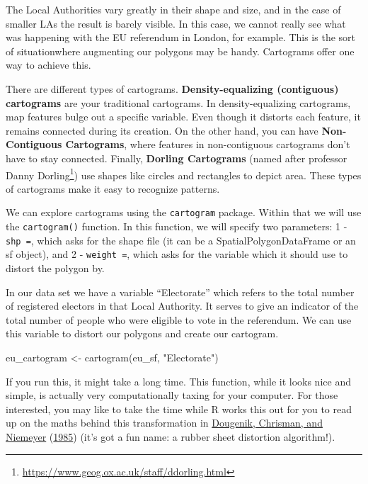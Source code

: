 \documentclass[
  krantz2]{krantz}
\makeatletter
\newenvironment{Shaded}{\begin{snugshade}}{\end{snugshade}}
\newcommand{\FunctionTok}[1]{\textcolor[rgb]{0,0,0}{#1}}
\newcommand{\NormalTok}[1]{#1}
\newcommand{\OtherTok}[1]{\textcolor[rgb]{0.37,0.37,0.37}{#1}}
\newcommand{\StringTok}[1]{\textcolor[rgb]{0.5,0.5,0.5}{#1}}
\renewcommand{\href}[2]{#2\footnote{\url{#1}}}
\newenvironment{kframe}{%
\medskip{}
\setlength{\fboxsep}{.8em}
 \def\at@end@of@kframe{}%
 \ifinner\ifhmode%
  \def\at@end@of@kframe{\end{minipage}}%
  \begin{minipage}{\columnwidth}%
 \fi\fi%
 \def\FrameCommand##1{\hskip\@totalleftmargin \hskip-\fboxsep
 \colorbox{shadecolor}{##1}\hskip-\fboxsep
     \hskip-\linewidth \hskip-\@totalleftmargin \hskip\columnwidth}%
 \MakeFramed {\advance\hsize-\width
   \@totalleftmargin\z@ \linewidth\hsize
   \@setminipage}}%
 {\par\unskip\endMakeFramed%
 \at@end@of@kframe}
\renewenvironment{Shaded}{\begin{kframe}}{\end{kframe}}
\makeatother
\begin{document}
The Local Authorities vary greatly in their shape and size, and in the case of smaller LAs the result is barely visible. In this case, we cannot really see what was happening with the EU referendum in London, for example. This is the sort of situationwhere augmenting our polygons may be handy. Cartograms offer one way to achieve this.

There are different types of cartograms. \textbf{Density-equalizing (contiguous) cartograms} are your traditional cartograms. In density-equalizing cartograms, map features bulge out a specific variable. Even though it distorts each feature, it remains connected during its creation. On the other hand, you can have \textbf{Non-Contiguous Cartograms}, where features in non-contiguous cartograms don't have to stay connected. Finally, \textbf{Dorling Cartograms} (named after professor \href{https://www.geog.ox.ac.uk/staff/ddorling.html}{Danny Dorling}) use shapes like circles and rectangles to depict area. These types of cartograms make it easy to recognize patterns.

We can explore cartograms using the \texttt{cartogram} package. Within that we will use the \texttt{cartogram()} function. In this function, we will specify two parameters: 1 - \texttt{shp\ =}, which asks for the shape file (it can be a SpatialPolygonDataFrame or an sf object), and 2 - \texttt{weight\ =}, which asks for the variable which it should use to distort the polygon by.

In our data set we have a variable ``Electorate'' which refers to the total number of registered electors in that Local Authority. It serves to give an indicator of the total number of people who were eligible to vote in the referendum. We can use this variable to distort our polygons and create our cartogram.

\begin{Shaded}
\begin{Highlighting}[]
\NormalTok{eu\_cartogram }\OtherTok{\textless{}{-}} \FunctionTok{cartogram}\NormalTok{(eu\_sf, }\StringTok{"Electorate"}\NormalTok{)}
\end{Highlighting}
\end{Shaded}

If you run this, it might take a long time. This function, while it looks nice and simple, is actually very computationally taxing for your computer. For those interested, you may like to take the time while R works this out for you to read up on the maths behind this transformation in \protect\hyperlink{ref-Dougenik_1985}{Dougenik, Chrisman, and Niemeyer} (\protect\hyperlink{ref-Dougenik_1985}{1985}) (it's got a fun name: a rubber sheet distortion algorithm!).
\end{document}
